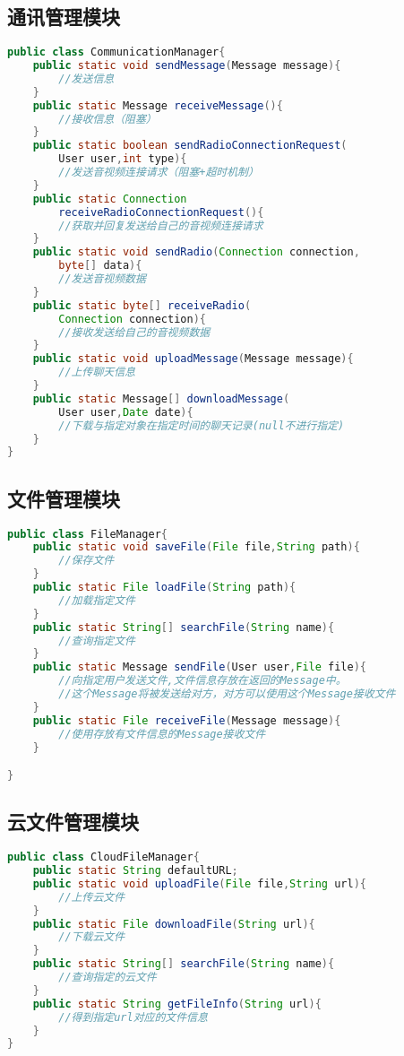 \subsection{通讯管理模块}
\begin{lstlisting}[language=Java, caption=通讯管理模块接口]
public class CommunicationManager{
    public static void sendMessage(Message message){
        //发送信息
    }
    public static Message receiveMessage(){
        //接收信息（阻塞）
    }
    public static boolean sendRadioConnectionRequest(
        User user,int type){
        //发送音视频连接请求（阻塞+超时机制）
    }
    public static Connection 
        receiveRadioConnectionRequest(){
        //获取并回复发送给自己的音视频连接请求
    }
    public static void sendRadio(Connection connection,
        byte[] data){
        //发送音视频数据
    }
    public static byte[] receiveRadio(
        Connection connection){
        //接收发送给自己的音视频数据
    }
    public static void uploadMessage(Message message){
        //上传聊天信息
    }
    public static Message[] downloadMessage(
        User user,Date date){
        //下载与指定对象在指定时间的聊天记录(null不进行指定)
    }
}
\end{lstlisting}


\subsection{文件管理模块}
\begin{lstlisting}[language=Java, caption=文件管理模块接口]
public class FileManager{
    public static void saveFile(File file,String path){
        //保存文件
    }
    public static File loadFile(String path){
        //加载指定文件
    }
    public static String[] searchFile(String name){
        //查询指定文件
    }
    public static Message sendFile(User user,File file){
        //向指定用户发送文件,文件信息存放在返回的Message中。
        //这个Message将被发送给对方，对方可以使用这个Message接收文件
    }
    public static File receiveFile(Message message){
        //使用存放有文件信息的Message接收文件
    }

}
\end{lstlisting}

\subsection{云文件管理模块}
\begin{lstlisting}[language=Java, caption=云文件管理模块接口]
public class CloudFileManager{
    public static String defaultURL;
    public static void uploadFile(File file,String url){
        //上传云文件
    }
    public static File downloadFile(String url){
        //下载云文件
    }
    public static String[] searchFile(String name){
        //查询指定的云文件
    }
    public static String getFileInfo(String url){
        //得到指定url对应的文件信息
    }
}
\end{lstlisting}

